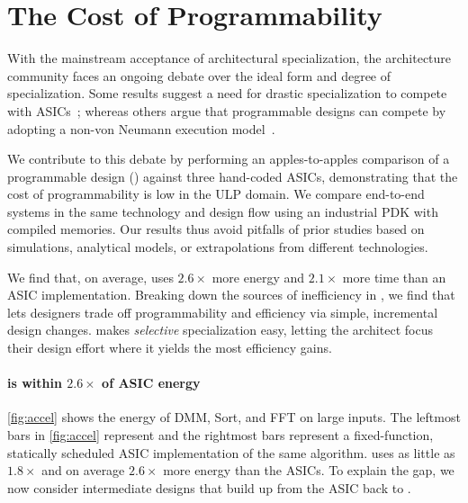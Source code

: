 \section{The Cost of Programmability}
\label{snafu:case}
%
With the mainstream acceptance of architectural specialization,
the architecture community faces an ongoing debate over the ideal form and degree of specialization.
%
Some results suggest a need for drastic specialization to compete
with ASICs~\cite{hameed2010understanding,taylor2012dark,shao2014aladdin};
%
whereas others argue that programmable designs can compete by
adopting a non-von Neumann execution
model~\cite{nowatzki2016dsa,nowatzki2017domain}.

We contribute to this debate by performing an apples-to-apples
comparison of a programmable design (\snafuarch) against three hand-coded ASICs,
%
demonstrating that the cost of programmability is low in the ULP domain.
%
We compare end-to-end systems in the same technology and design flow
using an industrial PDK with compiled memories.
%
Our results thus avoid pitfalls of prior studies based on simulations,
analytical models, or extrapolations from different
technologies.

We find that, on average, \snafuarch uses $2.6\times$ more energy
and $2.1\times$ more time than an ASIC implementation.
%
Breaking down the sources of inefficiency in \snafuarch,
%
we find that \snafu lets designers trade off programmability and efficiency
via simple, incremental design changes.
%
\snafu makes {\em selective} specialization easy, letting the architect
focus their design effort where it yields the most efficiency gains.

\paragraph{\snafu is within $2.6\times$ of ASIC energy}
\autoref{fig:accel} shows the energy of DMM, Sort, and FFT on large inputs.
%
The leftmost bars in \autoref{fig:accel} represent \snafuarch and the rightmost bars %
represent a fixed-function, statically scheduled ASIC implementation of the same algorithm.
% 
\snafuarch uses as little as $1.8\times$ and on average $2.6\times$ more energy than the ASICs.
%
To explain the gap,
we now consider intermediate designs that build up from the ASIC back to \snafuarch.

